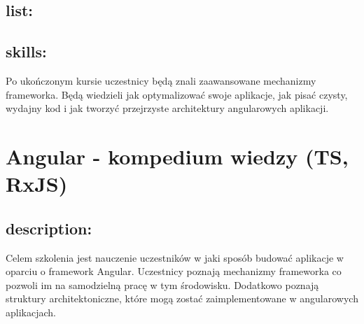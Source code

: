 \documentclass{article}[10pt]
\begin{document}
	\subsection*{list:}
\begin{adjustwidth}{1.5cm}{}
	\begin{itemize}




















	\end{itemize}
\end{adjustwidth}

	\subsection*{skills:}
\begin{adjustwidth}{2cm}{}
	
Po ukończonym kursie uczestnicy będą znali zaawansowane mechanizmy frameworka. Będą wiedzieli jak optymalizować swoje aplikacje, jak pisać czysty, wydajny kod i jak tworzyć przejrzyste architektury angularowych aplikacji.



\end{adjustwidth}

\newpage


    
	\section{Angular - kompedium wiedzy (TS, RxJS)}

	\subsection*{description:}
	\begin{adjustwidth}{2cm}{}
		
Celem szkolenia jest nauczenie uczestników w jaki sposób budować aplikacje w oparciu o framework Angular. Uczestnicy poznają mechanizmy frameworka co pozwoli im na samodzielną pracę w tym środowisku. Dodatkowo poznają struktury architektoniczne, które mogą zostać zaimplementowane w angularowych aplikacjach. 

	\end{adjustwidth}
\end{document}

